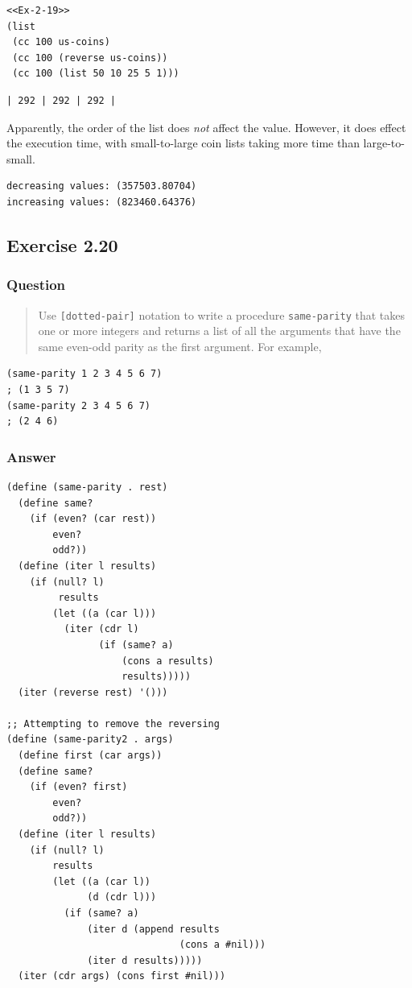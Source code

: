 \documentclass[final,fleqn,titlepage,twoside]{article}
\begin{document}
\begin{verbatim}
<<Ex-2-19>>
(list
 (cc 100 us-coins)
 (cc 100 (reverse us-coins))
 (cc 100 (list 50 10 25 5 1)))
\end{verbatim}

\begin{verbatim}
| 292 | 292 | 292 |
\end{verbatim}

Apparently, the order of the list does \emph{not} affect the value. However, it does effect the execution time, with small-to-large coin lists taking more time than large-to-small.

\begin{verbatim}
decreasing values: (357503.80704)
increasing values: (823460.64376)
\end{verbatim}

\subsection{Exercise 2.20}
\label{sec:orgf962b6f}
\subsubsection{Question}
\label{sec:org23d5ec2}
\begin{quote}
Use \texttt{[dotted-pair]} notation to write a procedure \texttt{same-parity} that takes one or
more integers and returns a list of all the arguments that have the same
even-odd parity as the first argument.  For example,
\end{quote}

\begin{verbatim}
(same-parity 1 2 3 4 5 6 7)
; (1 3 5 7)
(same-parity 2 3 4 5 6 7)
; (2 4 6)
\end{verbatim}

\subsubsection{Answer}
\label{sec:org39474d5}
\begin{verbatim}
(define (same-parity . rest)
  (define same?
    (if (even? (car rest))
        even?
        odd?))
  (define (iter l results)
    (if (null? l)
         results
        (let ((a (car l)))
          (iter (cdr l)
                (if (same? a)
                    (cons a results)
                    results)))))
  (iter (reverse rest) '()))

;; Attempting to remove the reversing
(define (same-parity2 . args)
  (define first (car args))
  (define same?
    (if (even? first)
        even?
        odd?))
  (define (iter l results)
    (if (null? l)
        results
        (let ((a (car l))
              (d (cdr l)))
          (if (same? a)
              (iter d (append results
                              (cons a #nil)))
              (iter d results)))))
  (iter (cdr args) (cons first #nil)))
\end{verbatim}
\end{document}
